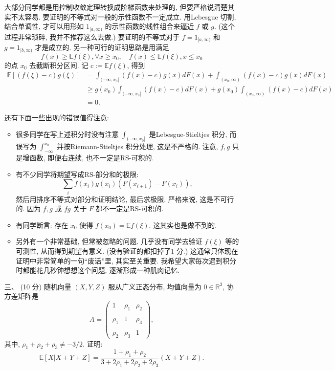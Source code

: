 \begin{enumerate}
\begin{proofc}
大部分同学都是用控制收敛定理转换成阶梯函数来处理的, 但要严格说清楚其实不太容易. 要证明的不等式对一般的示性函数不一定成立. 用Lebesgue 切割, 结合单调性, 才可以用形如 $1_{[a, \infty)}$ 的示性函数的线性组合来逼近 $f$ 或 $g$. (这个过程非常琐碎, 我并不推荐这么去做.) 要证明的不等式对于 $f=1_{[a, \infty)}$ 和 $g=1_{[b, \infty)}$ 才是成立的. 另一种可行的证明思路是用满足
\[
f(x)\geq \mathbb{E}f(\xi ), \forall x\geq x_{0}, \quad f(x)\leq \mathbb{E}f(\xi ), x\leq x_{0}
\]
的点 $x_{0}$ 去截断积分区间. 记 $c:=\mathbb{E} f(\xi)$, 得到
\[
\begin{aligned}
\mathbb{E}[(f(\xi)-c) g(\xi)] & =\int_{(-\infty, x_{0}]}(f(x)-c) g(x) d F(x)+\int_{(x_{0}, \infty)}(f(x)-c) g(x) d F(x) \\
& \geq g(x_{0}) \int_{(-\infty, x_{0}]}(f(x)-c) d F(x)+g(x_{0}) \int_{(x_{0}, \infty)}(f(x)-c) d F(x) \\
& =0 .
\end{aligned}
\]

还有下面一些出现的错误值得注意:
\begin{itemize}
\item 很多同学在写上述积分时没有注意 $\int_{(-\infty, x_{0}]}$ 是Lebesgue-Stieltjes 积分, 而误写为 $\int_{-\infty}^{x_0}$ 并按Riemann-Stieltjes 积分处理, 这是不严格的. 注意, $f, g$ 只是增函数, 即便右连续, 也不一定是RS-可积的.
\item 有不少同学将期望写成RS-部分和的极限: $$\sum_{i} f(x_{i}) g(x_{i})(F(x_{i+1})-F(x_{i})),$$ 然后用排序不等式对部分和证明结论, 最后求极限. 严格来说, 这是不可行的. 因为 $f, g$ 或 $fg$ 关于 $F$ 都不一定是RS-可积的.
\item 有同学断言: 存在 $x_{0}$ 使得 $f(x_{0})=\mathbb{E} f(\xi)$. 这其实也是做不到的.
\item 另外有一个非常基础, 但常被忽略的问题. 几乎没有同学去验证 $f(\xi)$ 等的可测性, 从而得到期望有意义. (没有验证的都扣掉了1 分.) 这通常只体现在证明中非常简单的一句“废话”里, 其实至关重要. 我希望大家每次遇到积分时都能花几秒钟想想这个问题, 逐渐形成一种肌肉记忆.\qedhere
\end{itemize}
    \end{proofc}

\item[三、](10 分)
随机向量 $(X, Y, Z)$ 服从广义正态分布, 均值向量为 $0 \in \mathbb{R}^{3}$, 协方差矩阵是
$$
A=\begin{pmatrix}
1 & \rho_{1} & \rho_{2} \\ \\
\rho_{1} & 1 & \rho_{3} \\ \\
\rho_{2} & \rho_{3} & 1
\end{pmatrix},
$$
其中, $\rho_{1}+\rho_{2}+\rho_{3} \neq-3 / 2$. 证明:
$$
\mathbb{E}[X | X+Y+Z]=\frac{1+\rho_{1}+\rho_{2}}{3+2 \rho_{1}+2 \rho_{2}+2 \rho_{3}}(X+Y+Z) .
$$


\end{enumerate}
